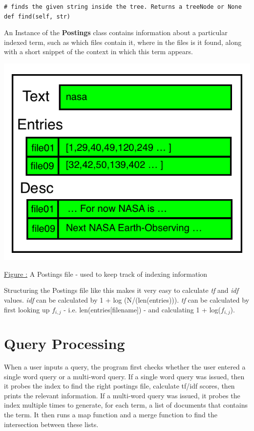 \documentclass[11pt]{article}
\newcounter{ctFigures}
\begin{document}
\begin{Verbatim}[frame=single]
# finds the given string inside the tree. Returns a treeNode or None
def find(self, str)
\end{Verbatim}
An Instance of the \textbf{Postings} class contains information about a particular indexed term, such as which files contain it, where in the files is it found, along with a short snippet of the context in which this term appears.
\begin{center}
\includegraphics[scale=0.6]{posting}
\begin{flushright}
\underline{Figure :} A Postings file - used to keep track of indexing information
\addtocounter{ctFigures}{1}
\end{flushright}
\end{center}
Structuring the Postings file like this makes it very easy to calculate \emph{tf} and \emph{idf} values. \emph{idf} can be calculated by 1 + log (N/(len(entries))). \emph{tf} can be calculated by first looking up $f_{i,j}$ - i.e. len(entries[filename]) - and calculating 1 + log($f_{i,j}$).
\section*{Query Processing}
When a user inputs a query, the program first checks whether the user entered a single word query or a multi-word query. If a single word query was issued, then it probes the index to find the right postings file, calculate tf/idf scores, then prints the relevant information. If a multi-word query was issued, it probes the index multiple times to generate, for each term, a list of documents that contains the term. It then runs a map function and a merge function to find the intersection between these lists. \\
\end{document}
